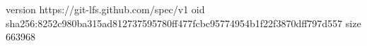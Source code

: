 version https://git-lfs.github.com/spec/v1
oid sha256:8252c980ba315ad812737595780ff477fcbc95774954b1f22f3870dff797d557
size 663968
